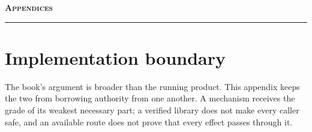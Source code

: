 
\clearpage
{}\label{book:appendices}
\begin{center}
  \vspace*{0.3cm}
  {\Huge\scshape\bfseries Appendices\par}
  \vspace{0.2cm}
  {\color{hhcobalt}\rule{0.3\textwidth}{1.5pt}}\par
  \vspace{0.4cm}
\end{center}
\appendix
\renewcommand{\thesection}{\Alph{section}}
\renewcommand{\thefigure}{A.\arabic{figure}}
\renewcommand{\thetable}{A.\arabic{table}}
\renewcommand{\theHsection}{volume.appendix.\arabic{section}}
\renewcommand{\theHsubsection}{volume.appendix.\arabic{section}.\arabic{subsection}}
\renewcommand{\theHsubsubsection}{volume.appendix.\arabic{section}.\arabic{subsection}.\arabic{subsubsection}}
\renewcommand{\theHfigure}{volume.appendix.\arabic{figure}}
\renewcommand{\theHtable}{volume.appendix.\arabic{table}}
\renewcommand{\theHequation}{volume.appendix.\arabic{equation}}
\renewcommand{\theHlstlisting}{volume.appendix.\arabic{lstlisting}}

\section{Implementation boundary}\label{app:volume-status}

The book's argument is broader than the running product. This appendix keeps the
two from borrowing authority from one another. A mechanism receives the grade of
its weakest necessary part; a verified library does not make every caller safe,
and an available route does not prove that every effect passes through it.


